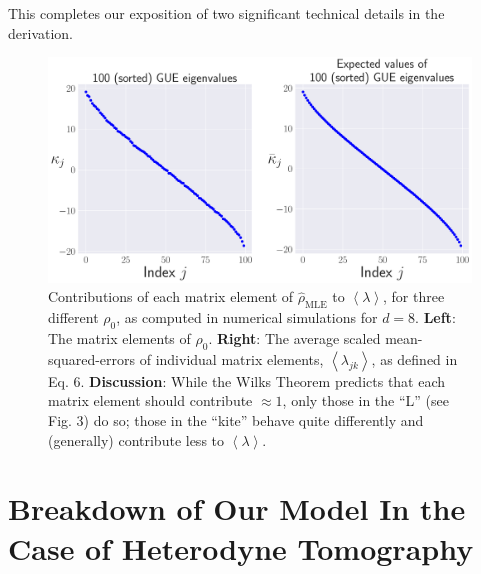 \documentclass[aps,pra, twocolumn]{revtex4}
\newcommand{\expect}[1]{\ensuremath{\left\langle#1\right\rangle}}
\newcommand{\rhohat}{\hat{\rho}}
\newcommand{\rhoMLE}{\rhohat_{\scriptscriptstyle\mathrm{MLE}}}
\begin{document}
This completes our exposition of two significant technical details in the derivation.

\begin{figure}[h!]
\includegraphics[width=\columnwidth]{Images/Figure_7.pdf}
 \caption{Contributions of each matrix element of $\rhoMLE$ to $\expect{\lambda}$, for three different $\rho_0$, as computed in numerical simulations for $d=8$.  \textbf{Left}:  The matrix elements of $\rho_0$.  \textbf{Right}:  The average scaled mean-squared-errors of individual matrix elements, $\expect{\lambda_{jk}}$, as defined in Eq. 6.  \textbf{Discussion}:  While the Wilks Theorem predicts that each matrix element should contribute $\approx1$, only those in the ``L'' (see Fig. 3) do so; those in the ``kite'' behave quite differently and (generally) contribute less to $\expect{\lambda}$.
}
\label{fig:isocontribs}
\end{figure}



\section{Breakdown of Our Model In the Case of Heterodyne Tomography}
\label{app:breakdown}
\end{document}
